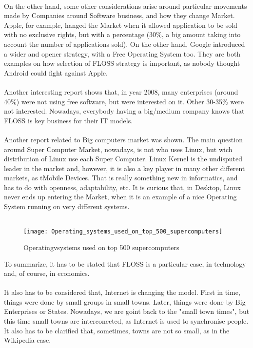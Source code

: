 \\
On the other hand, some other considerations arise around particular movements made by Companies around Software business, and how they change Market. Apple, for example,  hanged the Market when it allowed application to be sold with no exclusive rights, but with a percentage (30\%, a big amount taking into account the number of applications sold). On the other hand, Google introduced a wider and opener strategy, with a Free Operating System too. They are both examples on how selection of FLOSS strategy is important, as nobody thought Android could fight against Apple.\\
\\
Another interesting report shows that, in year 2008, many enterprises (around 40\%) were not using free software, but were interested on it. Other 30-35\% were not interested. Nowadays, everybody having a big/medium company knows that FLOSS is key business for their IT models.\\
\\
Another report related to Big computers market was shown. The main question around Super Computer Market, nowadays, is not who uses Linux, but wich distribution of Linux use each Super Computer. Linux Kernel is the undisputed leader in the market and, however, it is also a key player in many other different markets, as tMobile Devices. That is really something new in informatics, and has to do with openness, adaptability, etc. It is curious that, in Desktop, Linux never ends up entering the Market, when it is an example of a nice Operating System running on very different systems.\\
\\
\begin{figure}[htb]
	\begin{center}
		\texttt{[image: Operating\_systems\_used\_on\_top\_500\_supercomputers]}
		\caption{Operatingvsystems used on top 500 supercomputers}
		\label{fig:Operating_systems_used_on_top_500_supercomputers}
	\end{center}
\end{figure}
To summarize, it has to be stated that FLOSS is a particular case, in technology and, of course, in economics.\\\\
It also has to be considered that, Internet is changing the model. First in time, things were done by small groups in small towns. Later, things were done by Big Enterprises or States. Nowadays, we are goint back to the "small town times", but this time small towns are interconected, as Internet is used to synchronise people. It also has to be clarified that,  sometimes, towns are not so small, as in the Wikipedia case.\\
